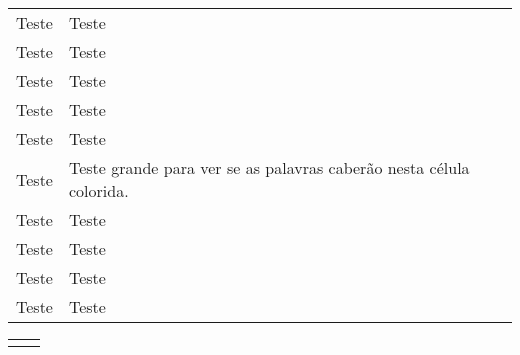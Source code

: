 \documentclass{article}
\begin{document}
	\begin{tabu} to 0.8\textwidth {lX[c,m]}
	\toprule
		Teste & Teste
		\everyrow{\midrule}
		\\ Teste & Teste\\ Teste & Teste\\
		Teste & Teste\\	Teste & Teste\\
	Teste & Teste grande para ver se as palavras caberão nesta célula colorida.\\
	Teste & Teste\\	Teste & Teste\\ Teste & Teste\\
		\everyrow{}
		Teste & Teste\\
		\bottomrule
	\end{tabu}
	
	\vspace{24pt}
	
	\begin{tabu}{X[-1]X}
	\end{tabu}
	
	
\end{document}
